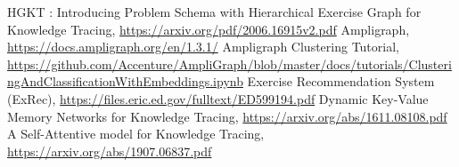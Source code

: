 \begin{thebibliography}{9}
	 HGKT : Introducing Problem Schema with Hierarchical Exercise Graph for Knowledge Tracing, \url{https://arxiv.org/pdf/2006.16915v2.pdf}
	 Ampligraph, \url{https://docs.ampligraph.org/en/1.3.1/}
	 Ampligraph Clustering Tutorial, \url{https://github.com/Accenture/AmpliGraph/blob/master/docs/tutorials/ClusteringAndClassificationWithEmbeddings.ipynb}
	 Exercise Recommendation System (ExRec), \url{https://files.eric.ed.gov/fulltext/ED599194.pdf}
	 Dynamic Key-Value Memory Networks for Knowledge Tracing, \url{https://arxiv.org/abs/1611.08108.pdf}
	 A Self-Attentive model for Knowledge Tracing, \url{https://arxiv.org/abs/1907.06837.pdf}
	
\end{thebibliography}
